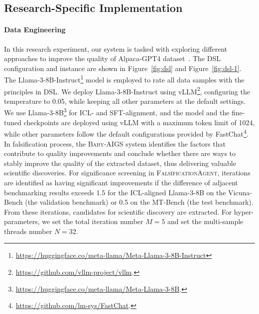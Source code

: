 \documentclass{article} %
\newcommand{\AIGS}{AIGS\xspace}
\newcommand{\AIGSSys}{\textsc{Baby-AIGS}\xspace}
\newcommand{\FalsificationAgent}{\textsc{FalsificationAgent}\xspace}
\newcommand{\DSL}{\textsc{DSL}\xspace}
\begin{document}
\subsection{Research-Specific Implementation}

\paragraph{Data Engineering}
In this research experiment, our system is tasked with exploring different approaches to improve the quality of Alpaca-GPT4 dataset~\citep{peng2023instruction}. The \DSL configuration and instance are shown in Figure~\ref{fig:dsl} and Figure~\ref{fig:dsl-1}. The Llama-3-8B-Instruct\footnote{\url{https://huggingface.co/meta-llama/Meta-Llama-3-8B-Instruct}} model is employed to rate all data samples with the principles in \DSL. We deploy Llama-3-8B-Instruct using vLLM\footnote{\url{https://github.com/vllm-project/vllm}.}, configuring the temperature to 0.05, while keeping all other parameters at the default settings. We use Llama-3-8B\footnote{\url{https://huggingface.co/meta-llama/Meta-Llama-3-8B}.} for ICL- and SFT-alignment, and the model and the fine-tuned checkpoints are deployed using vLLM with a maximum token limit of 1024, while other parameters follow the default configurations provided by FastChat\footnote{\url{https://github.com/lm-sys/FastChat}.}. 
In falsification process, the \AIGSSys system identifies the factors that contribute to quality improvements and conclude whether there are ways to stably improve the quality of the extracted dataset, thus delivering valuable scientific discoveries. 
For significance screening in \FalsificationAgent, iterations are identified as having significant improvements if the difference of adjacent benchmarking results exceeds 1.5 for the ICL-aligned Llama-3-8B on the Vicuna-Bench (the validation benchmark) or 0.5 on the MT-Bench (the test benchmark). From these iterations, candidates for scientific discovery are extracted. For hyper-parameters, we set the total iteration number $M=5$ and set the multi-sample threads number $N=32$.
\end{document}

